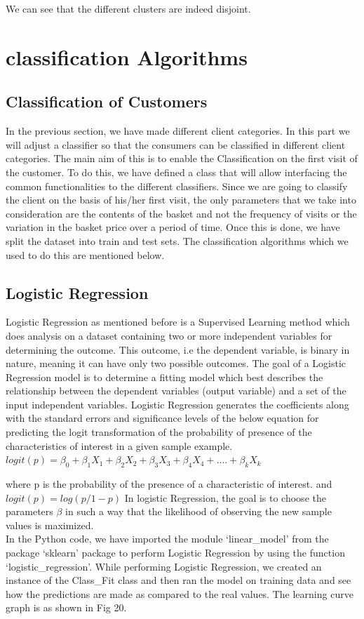 We can see that the different clusters are indeed disjoint.

\section{classification Algorithms}

\subsection{Classification of Customers}


In the previous section, we have made different client categories. In this part we will adjust a classifier so that the consumers can be classified in different client categories. The main aim of this is to enable the Classification on the first visit of the customer. To do this, we have defined a class that will allow interfacing the common functionalities to the different classifiers. Since we are going to classify the client on the basis of his/her first visit, the only parameters that we take into consideration are the contents of the basket and not the frequency of visits or the variation in the basket price over a period of time. Once this is done, we have split the dataset into train and test sets. The classification algorithms which we used to do this are mentioned below.

\subsection{Logistic Regression}
Logistic Regression as mentioned before is a Supervised Learning method which does analysis on a dataset containing two or more independent variables for determining the outcome. This outcome, i.e the dependent variable, is binary in nature, meaning it can have only two possible outcomes. The goal of a Logistic Regression model is to determine a fitting model which best describes the relationship between the dependent variables (output variable) and a set of the input independent variables. Logistic Regression generates the coefficients along with the standard errors and significance levels of the below equation for predicting the logit transformation of the probability of presence of the characteristics of interest in a given sample example. \\

$logit(p) = \beta_0 + \beta_1X_1 + \beta_2X_2 +\beta_3X_3 + \beta_4X_4 + .... + \beta_kX_k$

where p is the probability of the presence of a characteristic of interest.
and $logit(p) = log(p/1-p)$
In logistic Regression, the goal is to choose the parameters $\beta$ in such a way that the likelihood of observing the new sample values is maximized.\\
In the Python code, we have imported the module `linear\_model' from the package `sklearn' package to perform Logistic Regression by using the function `logistic\_regression'. While performing Logistic Regression, we created an instance of the Class\_Fit class and then ran the model on training data and see how the predictions are made as compared to the real values. The learning curve graph is as shown in Fig 20.

